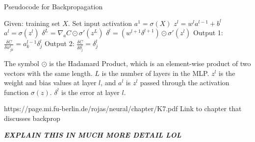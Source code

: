	\begin{algorithm}
		\caption{Pseudocode for Backpropagation}
		\label{alg:bg_gdBackprop}
		\begin{algorithmic}[1]
			\State Given: training set $X$.
			\State Set input activation $a^1=\sigma(X)$
			\State $z^l = w^l a^{l-1} +b^l$
			\State $a^l = \sigma(z^l)$ 
			\EndFor
			\State $\delta^L = \nabla_a C \odot \sigma '(z^L)$
			\State $\delta^l = (w^{l+1}\delta^{l+1}) \odot \sigma '(z^l)$
			\EndFor
			\State Output 1: $\frac{\delta C}{\delta w^{l}_{jk}} = a^{l-1}_{k}\delta^{l}_{j}$
			\State Output 2: $\frac{\delta C}{\delta b^{l}_{j}} = \delta^{l}_{j}$
			\EndProcedure
		\end{algorithmic}
	\end{algorithm}
	\par The symbol $\odot$ is the Hadamard Product, which is an element-wise product of two vectors with the same length. $L$ is the number of layers in the MLP. $z^l$ is the weight and bias values at layer $l$, and $a^l$ is $z^l$ passed through the activation function $\sigma(z)$. $\delta^l$ is the error at layer $l$.
	\par https://page.mi.fu-berlin.de/rojas/neural/chapter/K7.pdf Link to chapter that discusses backprop
	\par \textbf{\textit{ EXPLAIN THIS IN MUCH MORE DETAIL LOL}}
